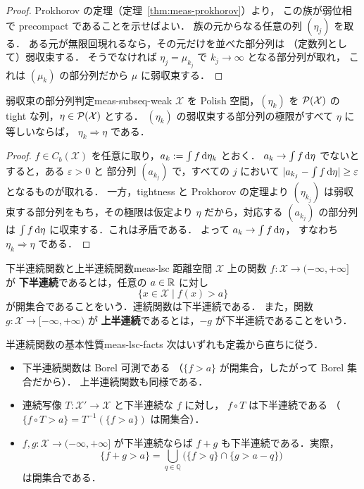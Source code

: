 \begin{proof}
  Prokhorov の定理（定理~\ref{thm:meas-prokhorov}）より，
  この族が弱位相で precompact であることを示せばよい．
  族の元からなる任意の列 $(\eta_j)$ を取る．
  ある元が無限回現れるなら，その元だけを並べた部分列は
  （定数列として）弱収束する．
  そうでなければ $\eta_j=\mu_{k_j}$ で $k_j\to\infty$ となる部分列が取れ，
  これは $(\mu_k)$ の部分列だから $\mu$ に弱収束する．
\end{proof}

\begin{lemma}{弱収束の部分列判定}{meas-subseq-weak}
  $\mathcal{X}$ を Polish 空間，$(\eta_k)$ を
  $\mathcal{P}(\mathcal{X})$ の tight な列，$\eta\in\mathcal{P}(\mathcal{X})$ とする．
  $(\eta_k)$ の弱収束する部分列の極限がすべて $\eta$ に等しいならば，
  $\eta_k\Rightarrow\eta$ である．
\end{lemma}

\begin{proof}
  $f\in C_b(\mathcal{X})$ を任意に取り，$a_k:=\int f\,\mathrm{d}\eta_k$ とおく．
  $a_k\to\int f\,\mathrm{d}\eta$ でないとすると，ある $\varepsilon>0$ と
  部分列 $(a_{k_j})$ で，すべての $j$ において
  $\lvert a_{k_j}-\int f\,\mathrm{d}\eta \rvert\geq\varepsilon$ となるものが取れる．
  一方，tightness と Prokhorov の定理より
  $(\eta_{k_j})$ は弱収束する部分列をもち，その極限は仮定より
  $\eta$ だから，対応する $(a_{k_j})$ の部分列は
  $\int f\,\mathrm{d}\eta$ に収束する．これは矛盾である．
  よって $a_k\to\int f\,\mathrm{d}\eta$，
  すなわち $\eta_k\Rightarrow\eta$ である．
\end{proof}

\begin{definition}{下半連続関数と上半連続関数}{meas-lsc}
  距離空間 $\mathcal{X}$ 上の関数 $f\colon \mathcal{X}\to(-\infty,+\infty]$ が
  \textbf{下半連続}であるとは，任意の $a\in\mathbb{R}$ に対し
  \[
    \{x\in \mathcal{X}\mid f(x)>a\}
  \]
  が開集合であることをいう．連続関数は下半連続である．
  また，関数 $g\colon \mathcal{X}\to[-\infty,+\infty)$ が
  \textbf{上半連続}であるとは，$-g$ が下半連続であることをいう．
\end{definition}

\begin{remark}{半連続関数の基本性質}{meas-lsc-facts}
  次はいずれも定義から直ちに従う．
  \begin{itemize}
    \item 下半連続関数は Borel 可測である
      （$\{f>a\}$ が開集合，したがって Borel 集合だから）．
      上半連続関数も同様である．
    \item 連続写像 $T\colon \mathcal{X}'\to \mathcal{X}$ と下半連続な $f$ に対し，
      $f\circ T$ は下半連続である
      （$\{f\circ T>a\}=T^{-1}(\{f>a\})$ は開集合）．
    \item $f,g\colon \mathcal{X}\to(-\infty,+\infty]$ が下半連続ならば
      $f+g$ も下半連続である．実際，
      \[
        \{f+g>a\}
        =\bigcup_{q\in\mathbb{Q}}\bigl(\{f>q\}\cap\{g>a-q\}\bigr)
      \]
      は開集合である．
  \end{itemize}
\end{remark}


